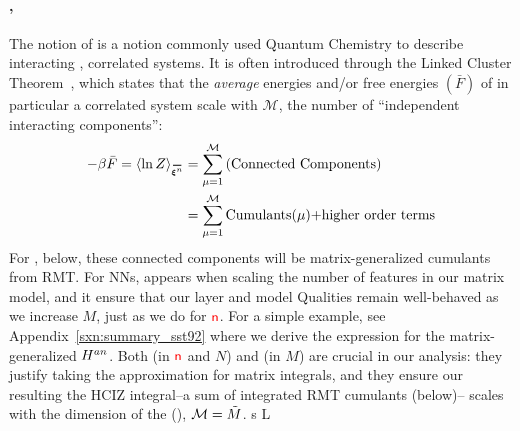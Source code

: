 \paragraph{\SizeConsistency,}  
The notion of \emph{\SizeConsistency} is a notion commonly 
used Quantum Chemistry to describe interacting , correlated systems. It is often introduced through the Linked Cluster Theorem~\cite{Hubbard1959,Brandow1963},
which states that the \emph{average} energies and/or free energies $(\bar{F})$ of in particular a correlated system scale with $\mathcal{M}$,
the number of ``independent interacting components'':
\begin{align}
  \label{eqn:LCT}
  -\beta \bar{F}=\langle \ln Z \rangle_{\AVGNDXIn} &= \sum_{\mu=1}^{\mathcal{M}}\text{(Connected Components)} \\ \nonumber
  &= \sum_{\mu=1}^{\mathcal{M}}\text{Cumulants($\mu$)+higher order terms} 
\end{align}
For \SETOL, below, these connected components will be matrix-generalized cumulants from RMT.
For NNs, \SizeConsistency appears when scaling the number of features in our matrix model,
and it ensure that our layer and model Qualities  remain well-behaved as we increase $M$, just as we do for ${\color{red}\sf{n}}$.
For a simple example, see Appendix~\ref{sxn:summary_sst92}
 where we derive the expression for the matrix-generalized
\AnnealedHamiltonian $H^{an}$.  
Both \SizeExtensivity (in ${\color{red}\sf{n}}$ and $N$) and \SizeConsistency (in $M$)
are crucial in our \SETOL analysis:  they justify taking the \LargeN approximation for matrix integrals, and they ensure
our resulting the HCIZ integral--a sum of integrated RMT cumulants (below)--
scales with the dimension of the \EffectiveCorrelationSpace (\ECS), $\mathcal{M}=\tilde{M}$.
%
s%
L%
